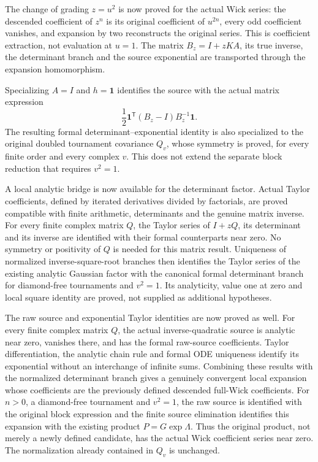 \documentclass[11pt]{article}
\begin{document}
The change of grading $z=u^2$ is now proved for the actual Wick series: the descended coefficient of $z^n$ is its original coefficient of $u^{2n}$, every odd coefficient vanishes, and expansion by two reconstructs the original series. This is coefficient extraction, not evaluation at $u=1$. The matrix $B_z=I+zKA$, its true inverse, the determinant branch and the source exponential are transported through the expansion homomorphism.

Specializing $A=I$ and $h=\mathbf1$ identifies the source with the actual matrix expression
\[
 \frac12\mathbf1^{\mathsf T}(B_z-I)B_z^{-1}\mathbf1.
\]
The resulting formal determinant–exponential identity is also specialized to the original doubled tournament covariance $Q_v$, whose symmetry is proved, for every finite order and every complex $v$. This does not extend the separate block reduction that requires $v^2=1$.

A local analytic bridge is now available for the determinant factor. Actual Taylor coefficients, defined by iterated derivatives divided by factorials, are proved compatible with finite arithmetic, determinants and the genuine matrix inverse. For every finite complex matrix $Q$, the Taylor series of $I+zQ$, its determinant and its inverse are identified with their formal counterparts near zero. No symmetry or positivity of $Q$ is needed for this matrix result. Uniqueness of normalized inverse-square-root branches then identifies the Taylor series of the existing analytic Gaussian factor with the canonical formal determinant branch for diamond-free tournaments and $v^2=1$. Its analyticity, value one at zero and local square identity are proved, not supplied as additional hypotheses.

The raw source and exponential Taylor identities are now proved as well. For every finite complex matrix $Q$, the actual inverse-quadratic source is analytic near zero, vanishes there, and has the formal raw-source coefficients. Taylor differentiation, the analytic chain rule and formal ODE uniqueness identify its exponential without an interchange of infinite sums. Combining these results with the normalized determinant branch gives a genuinely convergent local expansion whose coefficients are the previously defined descended full-Wick coefficients. For $n>0$, a diamond-free tournament and $v^2=1$, the raw source is identified with the original block expression and the finite source elimination identifies this expansion with the existing product $P=G\exp\Lambda$. Thus the original product, not merely a newly defined candidate, has the actual Wick coefficient series near zero. The normalization already contained in $Q_v$ is unchanged.
\end{document}
